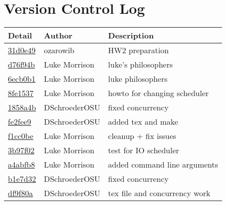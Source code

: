 \documentclass[10pt,letterpaper,draftclsnofoot,onecolumn]{IEEEtran}
\begin{document}
\section{Version Control Log}
\bigskip

\noindent\begin{tabular}{l l l}\textbf{Detail} & \textbf{Author} & \textbf{Description}\\\hline
\href{https://github.com/DSchroederOSU/CS444-Group\_11\_05/commit/31d0e499089bc16ec0f1a8651c6579b882fe3837}{31d0e49} & ozarowib & HW2 preparation\\\hline
\href{https://github.com/DSchroederOSU/CS444-Group\_11\_05/commit/d76f94b4ef4e153d4a4082e754008b003cbcb8fc}{d76f94b} & Luke Morrison & luke's philosophers\\\hline
\href{https://github.com/DSchroederOSU/CS444-Group\_11\_05/commit/6ecb0b1be6e85c16b4d50d2c492c10fb3598a1d2}{6ecb0b1} & Luke Morrison & luke philosophers\\\hline
\href{https://github.com/DSchroederOSU/CS444-Group\_11\_05/commit/8fe1537eedfae5e846f6cb43d280fc8f716fc7d0}{8fe1537} & Luke Morrison & howto for changing scheduler\\\hline
\href{https://github.com/DSchroederOSU/CS444-Group\_11\_05/commit/1858a4b72e56d55cf51047d145d37da8924d0a95}{1858a4b} & DSchroederOSU & fixed concurrency\\\hline
\href{https://github.com/DSchroederOSU/CS444-Group\_11\_05/commit/fe2fee9cb7be6a8dc4f24a05b72d855ab6f14d2e}{fe2fee9} & DSchroederOSU & added tex and make\\\hline
\href{https://github.com/DSchroederOSU/CS444-Group\_11\_05/commit/f1cc0bee6c166599c52da86c7462076456200697}{f1cc0be} & Luke Morrison & cleanup + fix issues\\\hline
\href{https://github.com/DSchroederOSU/CS444-Group\_11\_05/commit/3b97f026eb869e0905fb8d1b09213294b9f629d6}{3b97f02} & Luke Morrison & test for IO scheduler\\\hline
\href{https://github.com/DSchroederOSU/CS444-Group\_11\_05/commit/a4abfb8d116f312257ec679de7d846a52eec9281}{a4abfb8} & Luke Morrison & added command line arguments\\\hline
\href{https://github.com/DSchroederOSU/CS444-Group\_11\_05/commit/b1e7d32a4b99257f3570ea84c4e2a08c60eb89e1}{b1e7d32} & DSchroederOSU & fixed concurrency\\\hline
\href{https://github.com/DSchroederOSU/CS444-Group\_11\_05/commit/df9f80af0d69e84ff3f2b052b8af192c2340c0d5}{df9f80a} & DSchroederOSU & tex file and concurrency work\\\hline

\end{tabular}
\end{document}

